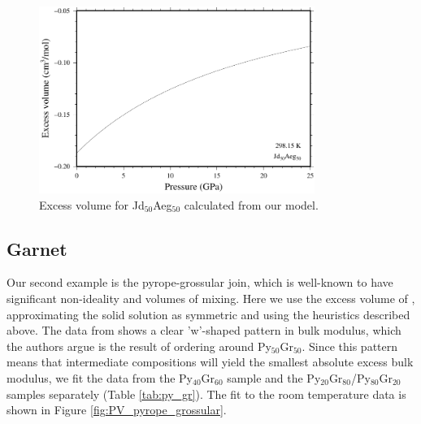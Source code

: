 \documentclass[review]{elsarticle}
\begin{document}
\begin{figure}[ht!]
  \centering
  \includegraphics[width=0.8\textwidth]{figures/jadeite50aegirine50_Vex}
  \caption{Excess volume for Jd$_{50}$Aeg$_{50}$ calculated from our model.}
  \label{fig:excess_volume_jadeite_aegirine}
\end{figure}

\clearpage
\subsection{Garnet}
Our second example is the pyrope-grossular join, which is well-known to have significant non-ideality and volumes of mixing. Here we use the excess volume of \cite{DCW2015}, approximating the solid solution as symmetric and using the heuristics described above. The data from \cite{DCW2015} shows a clear 'w'-shaped pattern in bulk modulus, which the authors argue is the result of ordering around Py$_{50}$Gr$_{50}$. Since this pattern means that intermediate compositions will yield the smallest absolute excess bulk modulus, we fit the data from the Py$_{40}$Gr$_{60}$ sample and the Py$_{20}$Gr$_{80}$/Py$_{80}$Gr$_{20}$ samples separately (Table \ref{tab:py_gr}). The fit to the room temperature data is shown in Figure \ref{fig:PV_pyrope_grossular}.
\end{document}
